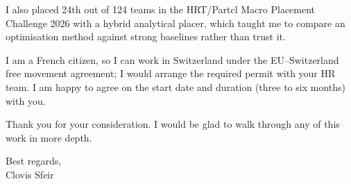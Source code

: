 \documentclass[11pt]{article}
\begin{document}
I also placed 24th out of 124 teams in the HRT/Partcl Macro Placement Challenge 2026 with a hybrid analytical placer, which taught me to compare an optimisation method against strong baselines rather than trust it.

I am a French citizen, so I can work in Switzerland under the EU--Switzerland free movement agreement; I would arrange the required permit with your HR team. I am happy to agree on the start date and duration (three to six months) with you.

Thank you for your consideration. I would be glad to walk through any of this work in more depth.

\vspace{1em}
Best regards, \\
Clovis Sfeir
\end{document}
